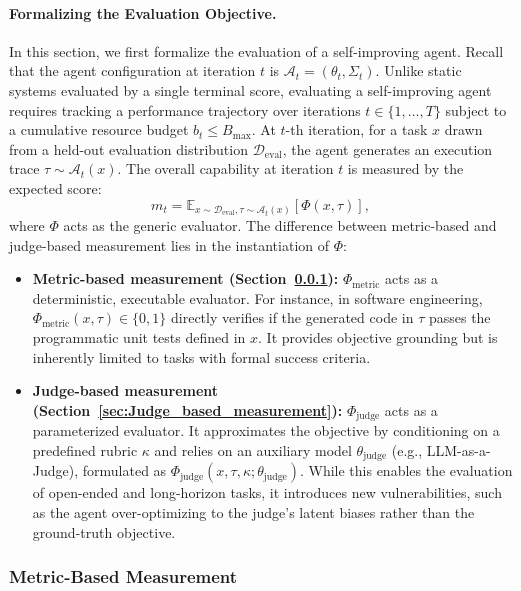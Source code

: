 \paragraph{Formalizing the Evaluation Objective.}
In this section, we first formalize the evaluation of a self-improving agent. Recall that the agent configuration at iteration $t$ is $\mathcal{A}_t = (\theta_t, \Sigma_t)$. Unlike static systems evaluated by a single terminal score, evaluating a self-improving agent requires tracking a performance trajectory over iterations $t \in \{1, \dots, T\}$ subject to a cumulative resource budget $b_t \le B_{\text{max}}$. At $t$-th iteration, for a task $x$ drawn from a held-out evaluation distribution $\mathcal{D}_{\text{eval}}$, the agent generates an execution trace $\tau \sim \mathcal{A}_t(x)$. The overall capability at iteration $t$ is measured by the expected score:
\begin{equation}
m_t = \mathbb{E}_{x \sim \mathcal{D}_{\text{eval}}, \tau \sim \mathcal{A}_t(x)} \left[ \Phi(x, \tau) \right],
\end{equation}
where $\Phi$ acts as the generic evaluator. The  difference between metric-based and judge-based measurement lies in the instantiation of $\Phi$:

\begin{itemize}
    \item \textbf{Metric-based measurement (Section~\ref{sec:Metric_based_measurement}):} $\Phi_{\text{metric}}$ acts as a deterministic, executable evaluator. For instance, in software engineering, $\Phi_{\text{metric}}(x, \tau) \in \{0, 1\}$ directly verifies if the generated code in $\tau$ passes the programmatic unit tests defined in $x$. It provides objective grounding but is inherently limited to tasks with formal success criteria.
    \item \textbf{Judge-based measurement (Section~\ref{sec:Judge_based_measurement}):} $\Phi_{\text{judge}}$ acts as a parameterized evaluator. It approximates the  objective by conditioning on a predefined rubric $\kappa$ and relies on an auxiliary model $\theta_{\text{judge}}$ (e.g., LLM-as-a-Judge), formulated as $\Phi_{\text{judge}}(x, \tau, \kappa; \theta_{\text{judge}})$. While this enables the evaluation of open-ended and long-horizon tasks, it introduces new vulnerabilities, such as the agent over-optimizing to the judge's latent biases rather than the ground-truth objective.
\end{itemize}


\subsubsection{Metric-Based Measurement}
\label{sec:Metric_based_measurement}



